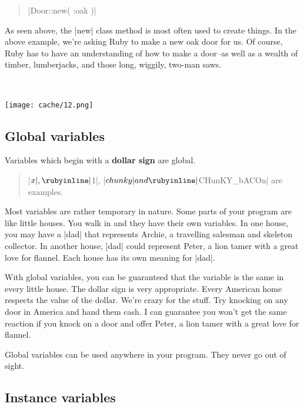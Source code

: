 \documentclass[12pt,twoside]{report}
\begin{document}
\begin{quote}
\rubyinline|Door::new( :oak )|\end{quote}


As seen above, the \rubyinline|new| class method is
most often used to create things.  In the above example, we're asking
Ruby to make a new oak door for us.  Of course, Ruby has to have an
understanding of how to make a door--as well as a wealth of timber,
lumberjacks, and those long, wiggily, two-man saws.

\ %

	\hspace{5cm}\texttt{[image: cache/12.png]}




\subsection{Global variables}



Variables which begin with a {\bf dollar sign} are global.

\begin{quote}
\rubyinline|$x|, \rubyinline|$1|,
\rubyinline|$chunky| and
\rubyinline|$CHunKY_bACOn| are examples.\end{quote}


Most variables are rather temporary in nature.  Some parts of your
program are like little houses. You walk in and they have their own
variables.  In one house, you may have a
\rubyinline|dad| that represents Archie, a travelling
salesman and skeleton collector.  In another house,
\rubyinline|dad| could represent Peter, a lion tamer
with a great love for flannel.  Each house has its own meaning for
\rubyinline|dad|.

With global variables, you can be guaranteed that the variable is the
same in every little house. The dollar sign is very appropriate.
Every American home respects the value of the dollar.  We're crazy for
the stuff.  Try knocking on any door in America and hand them cash.  I
can guarantee you won't get the same reaction if you knock on a door
and offer Peter, a lion tamer with a great love for flannel.

Global variables can be used anywhere in your program.  They never go
out of sight.




\subsection{Instance variables}
\end{document}
